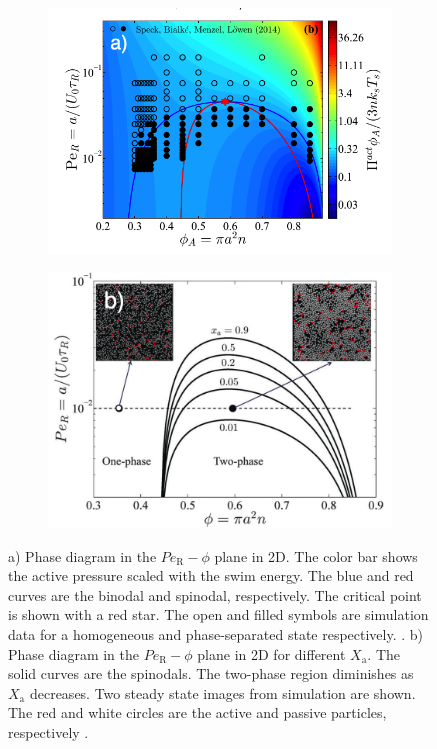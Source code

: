 \documentclass[11pt]{article}
\begin{document}
\begin{figure}[ht]
     \centering
     \begin{subfigure}[b]{0.5\textwidth}
         \centering
         \includegraphics[width=\textwidth]{Screen Shot 2020-08-07 at 10.53.40 AM.png}
         \label{fig:pressure}
     \end{subfigure}
     \hfill
     \begin{subfigure}[b]{0.45\textwidth}
         \centering
         \includegraphics[width=\textwidth]{Screen Shot 2020-08-13 at 1.57.21 PM.png}
         \label{fig:densbin}
     \end{subfigure}
        \caption{a) Phase diagram in the $Pe_\text{R}-\phi$ plane in 2D. The color bar shows the active pressure scaled with the swim energy. The blue and red curves are the binodal and spinodal, respectively. The critical point is shown with a red star. The open and filled symbols are simulation data for a homogeneous and phase-separated state respectively. \cite{Takatori2}. b) Phase diagram in the $Pe_\text{R}-\phi$ plane in 2D for different $X_\text{a}$. The solid curves are the spinodals. The two-phase region diminishes as $X_\text{a}$ decreases. Two steady state images from simulation are shown. The red and white circles are the active and passive particles, respectively \cite{Takatori3}.}
        \label{fig:two graphs}
\end{figure}
\end{document}
